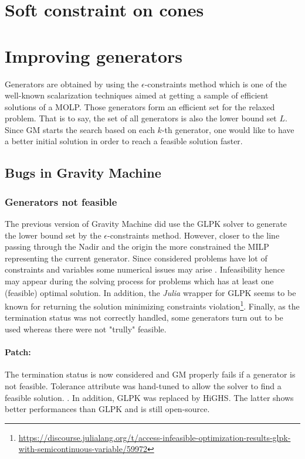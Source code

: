\section{Soft constraint on cones}


\section{Improving generators}
Generators are obtained by using the $\epsilon$-constraints method which is one of the well-known scalarization techniques \cite{Chankong1983MultiobjectiveDM} aimed at getting a sample of efficient solutions of a MOLP. Those generators form an efficient set for the relaxed problem. That is to say, the set of all generators is also the lower bound set $L$. Since GM starts the search based on each $k$-th generator, one would like to have a better initial solution in order to reach a feasible solution faster.

\subsection{Bugs in Gravity Machine}
\subsubsection*{Generators not feasible}
The previous version of Gravity Machine did use the GLPK solver to generate the lower bound set by the $\epsilon$-constraints method. 
However, closer to the line passing through the Nadir and the origin the more constrained the MILP representing the current generator. 
Since considered problems have lot of constraints and variables some numerical issues may arise \cite{gurobiNumIssues}. Infeasibility hence
may appear during the solving process for problems which has at least one (feasible) optimal solution. In addition, the \textit{Julia} wrapper
for GLPK seems to be known for returning the solution minimizing constraints violation\footnote{\url{https://discourse.julialang.org/t/access-infeasible-optimization-results-glpk-with-semicontinuous-variable/59972}}.
Finally, as the termination status was not correctly handled, some generators turn out to be used whereas there were not "trully" feasible.  
\paragraph*{Patch:}
The termination status is now considered and GM properly fails if a generator is not feasible. 
Tolerance attribute was hand-tuned to allow the solver to find a feasible solution. .
In addition, GLPK was replaced by HiGHS\cite{highs}. The latter shows better performances \cite{bench_solver} than GLPK and is still open-source.


